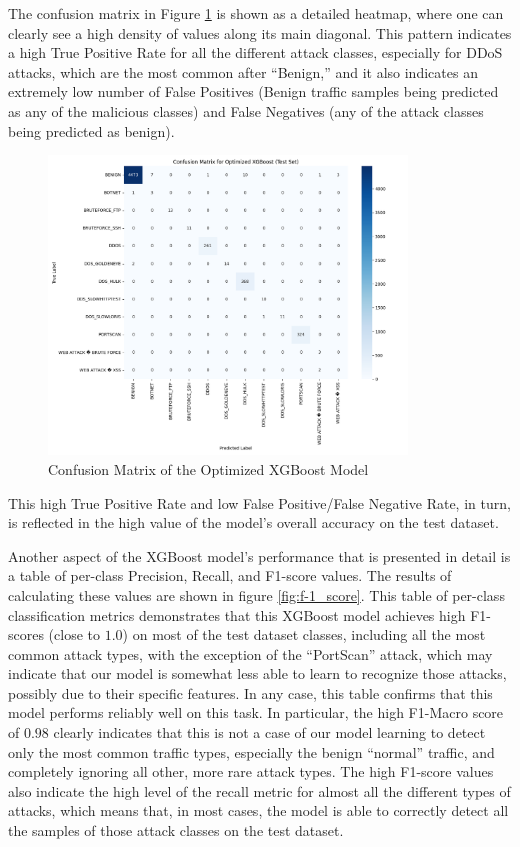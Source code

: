 The confusion matrix in Figure \ref{fig:confusion_matrix_xgboost} is shown as a detailed heatmap, where one can clearly see a high density of values along its main diagonal. This pattern indicates a high True Positive Rate for all the different attack classes, especially for DDoS attacks, which are the most common after “Benign,” and it also indicates an extremely low number of False Positives (Benign traffic samples being predicted as any of the malicious classes) and False Negatives (any of the attack classes being predicted as benign).

\begin{figure}[H]
	\centering
	\includegraphics[width=0.85\textwidth]{assets/figures/results/confusion_matrix_xgboost.png}
	\caption{Confusion Matrix of the Optimized XGBoost Model}
	\label{fig:confusion_matrix_xgboost}
\end{figure}


This high True Positive Rate and low False Positive/False Negative Rate, in turn, is reflected in the high value of the model’s overall accuracy on the test dataset.

Another aspect of the XGBoost model’s performance that is presented in detail is a table of per-class Precision, Recall, and F1-score values. The results of calculating these values are shown in figure \ref{fig:f-1_score}. This table of per-class classification metrics demonstrates that this XGBoost model achieves high F1-scores (close to $1.0$) on most of the test dataset classes, including all the most common attack types, with the exception of the “PortScan” attack, which may indicate that our model is somewhat less able to learn to recognize those attacks, possibly due to their specific features. In any case, this table confirms that this model performs reliably well on this task. In particular, the high F1-Macro score of $0.98$ clearly indicates that this is not a case of our model learning to detect only the most common traffic types, especially the benign “normal” traffic, and completely ignoring all other, more rare attack types. The high F1-score values also indicate the high level of the recall metric for almost all the different types of attacks, which means that, in most cases, the model is able to correctly detect all the samples of those attack classes on the test dataset.

